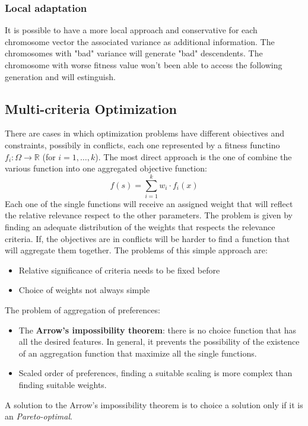 \documentclass{article}
\begin{document}
\subsubsection{Local adaptation}
It is possible to have a more local approach and conservative for each
chromosome vector the associated variance as additional information.
The chromosomes with "bad" variance will generate "bad" descendents. The chromosome with worse fitness
value won't been able to access the following generation and will estinguish.

\subsection{Multi-criteria Optimization}
There are cases in which optimization problems have different obiectives and constraints, possibily
in conflicts, each one represented by a fitness functino $f_i:\Omega\rightarrow\mathbb{R}$ (for $i=1,\dots,k$).
The most direct approach is the one of combine the various function into one aggregated objective function:
$$f(s)=\sum_{i=1}^k w_i\cdot f_i(x)$$
Each one of the single functions will receive an assigned weight that will reflect the relative
relevance respect to the other parameters. The problem is given by finding an adequate distribution
of the weights that respects the relevance criteria. If, the objectives are in conflicts will
be harder to find a function that will aggregate them together.
The problems of this simple approach are:
\begin{itemize}
    \item Relative significance of criteria needs to be fixed before
    \item Choice of weights not always simple
\end{itemize}
The problem of aggregation of preferences:
\begin{itemize}
    \item The \textbf{Arrow's impossibility theorem}: there is no choice function that has all the
          desired features. In general, it prevents the possibility of the existence of an aggregation
          function that maximize all the single functions.
    \item Scaled order of preferences, finding a suitable scaling is more complex than
          finding suitable weights.
\end{itemize}
A solution to the Arrow's impossibility theorem is to choice a solution only if it is an
\textit{Pareto-optimal}.
\end{document}
